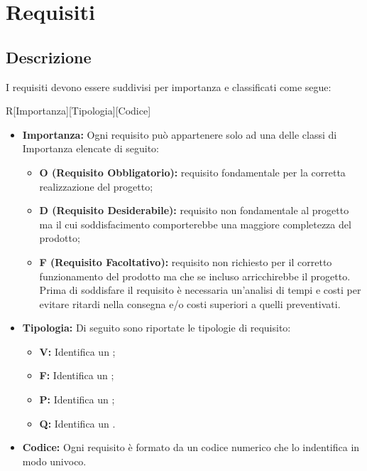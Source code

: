 \documentclass[../AnalisideiRequisiti.tex]{subfiles}
\begin{document}
	\chapter{Requisiti}
	\section{Descrizione} 
	I requisiti devono essere suddivisi per importanza e classificati come segue:
	
	\begin{center}
		R[Importanza][Tipologia][Codice]
	\end{center}
	
	\begin{itemize}
		\item \textbf{Importanza:} Ogni requisito può appartenere solo ad una delle classi di Importanza elencate di seguito:
		\begin{itemize}
			\item \textbf{O (Requisito Obbligatorio):} requisito fondamentale per la corretta realizzazione del progetto;
			\item \textbf{D (Requisito Desiderabile):} requisito non fondamentale al progetto ma il cui soddisfacimento comporterebbe una maggiore completezza del prodotto;
			\item \textbf{F (Requisito Facoltativo):} requisito non richiesto per il corretto funzionamento del prodotto ma che se incluso arricchirebbe il progetto. Prima di soddisfare il requisito è necessaria un’analisi di tempi e costi per evitare ritardi nella consegna e/o costi superiori a quelli preventivati.
		\end{itemize}
		\item \textbf{Tipologia:} Di seguito sono riportate le tipologie di requisito:
		\begin{itemize}
			\item \textbf{V:} Identifica un ;
			\item \textbf{F:} Identifica un ;
			\item \textbf{P:} Identifica un ;
			\item \textbf{Q:} Identifica un .
		\end{itemize}
		\item \textbf{Codice:} Ogni requisito è formato da un codice numerico che lo indentifica in modo univoco.
	\end{itemize}
	\newpage
\end{document}
